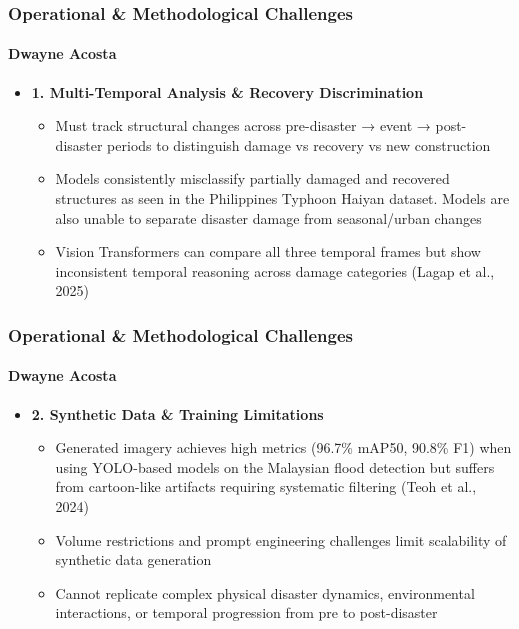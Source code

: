 \documentclass{beamer}
\newcommand{\namedframe}[3]{
  \begin{frame}
    \frametitle{#2}
    \framesubtitle{#1}
    #3
  \end{frame}
}
\begin{document}
\namedframe{Dwayne Acosta}{Operational \& Methodological Challenges}{
\begin{itemize}
    \item \textbf{1. Multi-Temporal Analysis \& Recovery Discrimination}
    \begin{itemize}
        \item Must track structural changes across pre-disaster → event → post-disaster periods to distinguish damage vs recovery vs new construction
        \item Models consistently misclassify partially damaged and recovered structures as seen in the Philippines Typhoon Haiyan dataset. Models are also unable to separate disaster damage from seasonal/urban changes
        \item Vision Transformers can compare all three temporal frames but show inconsistent temporal reasoning across damage categories (Lagap et al., 2025)
    \end{itemize}
\end{itemize}    
}



\namedframe{Dwayne Acosta}{Operational \& Methodological Challenges}{
\begin{itemize}

    \item \textbf{2. Synthetic Data \& Training Limitations}
    \begin{itemize}
        \item Generated imagery achieves high metrics (96.7\% mAP50, 90.8\% F1) when using YOLO-based models on the Malaysian flood detection but suffers from cartoon-like artifacts requiring systematic filtering (Teoh et al., 2024)
        \item Volume restrictions and prompt engineering challenges limit scalability of synthetic data generation
        \item Cannot replicate complex physical disaster dynamics, environmental interactions, or temporal progression from pre to post-disaster
    \end{itemize}
\end{itemize}
}
\end{document}
